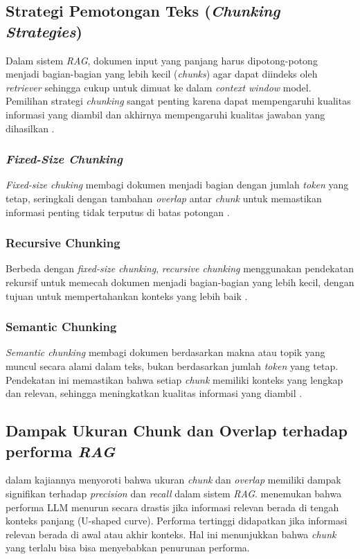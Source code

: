 \subsection{Strategi Pemotongan Teks (\textit{Chunking Strategies})}
Dalam sistem \textit{RAG}, dokumen input yang panjang harus dipotong-potong menjadi bagian-bagian yang lebih kecil (\textit{chunks}) agar dapat diindeks oleh \textit{retriever} sehingga cukup untuk dimuat ke dalam \textit{context window} model. Pemilihan strategi \textit{chunking} sangat penting karena dapat mempengaruhi kualitas informasi yang diambil dan akhirnya mempengaruhi kualitas jawaban yang dihasilkan \citep{zhu2026bestpractices}.

\subsubsection{\textit{Fixed-Size Chunking}}
\textit{Fixed-size chuking} membagi dokumen menjadi bagian dengan jumlah \textit{token} yang tetap, seringkali dengan tambahan \textit{overlap} antar \textit{chunk} untuk memastikan informasi penting tidak terputus di batas potongan \citep{lamsal2025chunking}. 

\subsubsection{Recursive Chunking}
Berbeda dengan \textit{fixed-size chunking}, \textit{recursive chunking} menggunakan pendekatan rekursif untuk memecah dokumen menjadi bagian-bagian yang lebih kecil, dengan tujuan untuk mempertahankan konteks yang lebih baik \citep{lamsal2025chunking}. 

\subsubsection{Semantic Chunking}
\textit{Semantic chunking} membagi dokumen berdasarkan makna atau topik yang muncul secara alami dalam teks, bukan berdasarkan jumlah \textit{token} yang tetap. Pendekatan ini memastikan bahwa setiap \textit{chunk} memiliki konteks yang lengkap dan relevan, sehingga meningkatkan kualitas informasi yang diambil \citep{lamsal2025chunking}.

\subsection{Dampak Ukuran Chunk dan Overlap terhadap performa \textit{RAG}}
\citet{zhu2026bestpractices} dalam kajiannya menyoroti bahwa ukuran \textit{chunk} dan \textit{overlap} memiliki dampak signifikan terhadap \textit{precision} dan \textit{recall} dalam sistem \textit{RAG}. \citet{Liu2023LostIT} menemukan bahwa performa LLM menurun secara drastis jika informasi relevan berada di tengah konteks panjang (U-shaped curve). Performa tertinggi didapatkan jika informasi relevan berada di awal atau akhir konteks. Hal ini menunjukkan bahwa \textit{chunk} yang terlalu bisa bisa menyebabkan penurunan performa.

